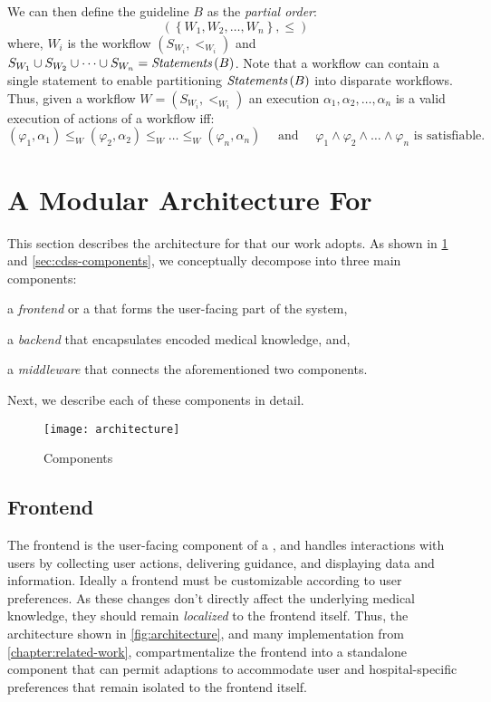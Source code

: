 We can then define the guideline $B$ as the \emph{partial order}:
\[
  \left(\left\{W_1,W_2,\dots,W_n\right\}, \leq\right)
\]
where, $W_i$ is the workflow $\left(S_{W_i}, <_{W_i}\right)$ and
$S_{W_1} \cup S_{W_2} \cup \dots \cup S_{W_n} = \textit{Statements}\left(B\right)$. Note that a
workflow can contain a single statement to enable partitioning $\textit{Statements}\left(B\right)$
into disparate workflows. Thus, given a workflow $W =\left(S_{W_i},
    <_{W_i}\right)$  an execution
$\alpha_1,\alpha_2,\dots,\alpha_n$ is a valid execution of actions of a workflow
iff:
\[
  \left(\varphi_1,\alpha_1\right) \leq_W \left(\varphi_2,\alpha_2\right) \leq_W \dots \leq_W \left(\varphi_n,\alpha_n\right)
  \quad\text{ and }\quad
  \varphi_1 \wedge \varphi_2 \wedge \dots \wedge \varphi_n \text{ is satisfiable.}
\]

\section{A Modular Architecture For \CDSSs{}}\label{sec:modular-cdss-architecture}
This section describes the architecture for \CDSSs{}
that our work adopts. As shown in \figurename{} \ref{fig:architecture}
and \autoref{sec:cdss-components}, we conceptually
decompose \CDSSs{} into three main components:
\begin{enumerate*}[label=(\roman*)]
    \item a \emph{frontend} or a \UI{} that forms the user-facing part of the system,
    \item a \emph{backend} that encapsulates encoded medical knowledge, and,
    \item a \emph{middleware} that connects the aforementioned two components.
\end{enumerate*}
Next, we describe each of these components in detail.

\begin{figure}[t]
\centering
\texttt{[image: architecture]}
\caption{\CDSSs{} Components}\label{fig:architecture}
\end{figure}


\subsection{Frontend}\label{sec:frontend}

The frontend is the user-facing component of a \CDSS{}, and
handles interactions with users by collecting user actions,
delivering guidance, and displaying data and information.
Ideally a \CDSS{} frontend must be customizable according to
user preferences. As these changes don't directly
affect the underlying medical knowledge, they should remain
\emph{localized} to the frontend itself.
Thus, the architecture shown in \autoref{fig:architecture},
and many implementation from \autoref{chapter:related-work},
compartmentalize the frontend into a standalone component that
can permit adaptions to accommodate user and hospital-specific
preferences that remain isolated to the frontend itself.

